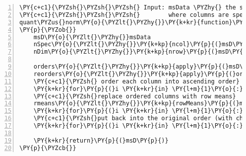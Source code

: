 \begin{Verbatim}[commandchars=\\\{\},codes={\catcode`\$=3\catcode`\^=7\catcode`\_=8},gobble=0,numbers=left,fontfamily=fvm,fontshape=n,fontsize=\footnotesize,tabsize=2]
\PY{c+c1}{\PYZsh{}\PYZsh{}\PYZsh{} Input: msData \PYZhy{} the spectra intensities in matrix}
\PY{c+c1}{\PYZsh{}\PYZsh{}\PYZsh{}        where columns are spectra $1,2,\hdots,n$}
quant\PYZus{}norm\PY{o}{\PYZlt{}\PYZhy{}}\PY{k+kr}{function}\PY{p}{(}msData\PY{p}{)}
\PY{p}{\PYZob{}}
	msD\PY{o}{\PYZlt{}\PYZhy{}}msData
	nSpec\PY{o}{\PYZlt{}\PYZhy{}}\PY{k+kp}{ncol}\PY{p}{(}msD\PY{p}{)}
	nDim\PY{o}{\PYZlt{}\PYZhy{}}\PY{k+kp}{nrow}\PY{p}{(}msD\PY{p}{)}

	orders\PY{o}{\PYZlt{}\PYZhy{}}\PY{k+kp}{apply}\PY{p}{(}msD\PY{p}{,} \PY{l+m}{2}\PY{p}{,} \PY{k+kp}{order}\PY{p}{)}
	reorders\PY{o}{\PYZlt{}\PYZhy{}}\PY{k+kp}{apply}\PY{p}{(}orders\PY{p}{,} \PY{l+m}{2}\PY{p}{,} \PY{k+kp}{order}\PY{p}{)}
	\PY{c+c1}{\PYZsh{} order each column into ascending order}
	\PY{k+kr}{for}\PY{p}{(}i \PY{k+kr}{in} \PY{l+m}{1}\PY{o}{:}nSpec\PY{p}{)} msD\PY{p}{[}\PY{p}{,}i\PY{p}{]}\PY{o}{\PYZlt{}\PYZhy{}}msD\PY{p}{[}orders\PY{p}{[}\PY{p}{,}i\PY{p}{]}\PY{p}{,}i\PY{p}{]}
	\PY{c+c1}{\PYZsh{}replace ordered columns with row means}
	rmeans\PY{o}{\PYZlt{}\PYZhy{}}\PY{k+kp}{rowMeans}\PY{p}{(}msD\PY{p}{)}
	\PY{k+kr}{for}\PY{p}{(}i \PY{k+kr}{in} \PY{l+m}{1}\PY{o}{:}nSpec\PY{p}{)} msD\PY{p}{[}\PY{p}{,}i\PY{p}{]}\PY{o}{\PYZlt{}\PYZhy{}}rmeans
	\PY{c+c1}{\PYZsh{}put back into the original order (with changed values)}
	\PY{k+kr}{for}\PY{p}{(}i \PY{k+kr}{in} \PY{l+m}{1}\PY{o}{:}nSpec\PY{p}{)} msD\PY{p}{[}\PY{p}{,}i\PY{p}{]}\PY{o}{\PYZlt{}\PYZhy{}}msD\PY{p}{[}reorders\PY{p}{[}\PY{p}{,}i\PY{p}{]}\PY{p}{,}i\PY{p}{]}

	\PY{k+kr}{return}\PY{p}{(}msD\PY{p}{)}
\PY{p}{\PYZcb{}}
\end{Verbatim}
